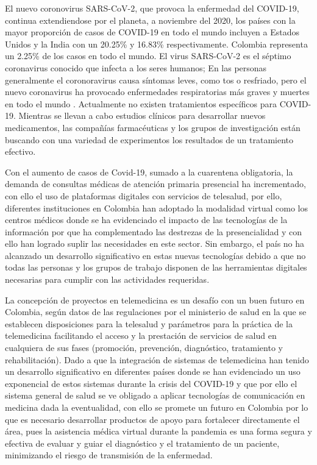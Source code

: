
El nuevo coronovirus SARS-CoV-2, que provoca la enfermedad del COVID-19, continua extendiendose por el planeta, a noviembre del 2020, los pa\'ises con la mayor proporci\'on de casos de COVID-19 en todo el mundo incluyen a Estados Unidos y la  India con un 20.25\% y 16.83\% respectivamente. Colombia representa un 2.25\% de los casos en todo el mundo. El virus SARS-CoV-2 es el s\'eptimo coronavirus conocido que infecta a los seres humanos; En las personas generalmente el coronoravirus causa s\'intomas leves, como tos o resfriado, pero el nuevo coronavirus ha provocado enfermedades respiratorias m\'as graves y muertes en todo el mundo \cite{28}. Actualmente no existen tratamientos espec\'ificos para COVID-19. Mientras se llevan a cabo estudios cl\'inicos para desarrollar nuevos medicamentos, las compa\~{n}\'ias farmac\'euticas y los grupos de investigaci\'on est\'an buscando con una variedad de experimentos los resultados de un tratamiento efectivo. 

Con el aumento de casos de Covid-19, sumado a la cuarentena obligatoria, la demanda de consultas m\'edicas de atenci\'on primaria presencial ha incrementado, con ello el uso de plataformas digitales con servicios de telesalud, por ello,  diferentes instituciones en Colombia han adoptado la modalidad virtual como los centros m\'edicos donde se ha evidenciado el impacto de las tecnolog\'ias de la informaci\'on por que ha complementado las destrezas de la presencialidad y con ello han logrado suplir las necesidades en este sector\cite{3}. Sin embargo, el pa\'is no ha alcanzado un desarrollo significativo en estas nuevas tecnolog\'ias debido a que no todas las personas y los grupos de trabajo disponen de las herramientas digitales necesarias para cumplir con las actividades requeridas. 

La concepci\'on de proyectos en telemedicina es un desaf\'io con un buen futuro en Colombia, seg\'un datos de  las regulaciones por el ministerio de salud en la que se establecen disposiciones para la telesalud y par\'ametros para la pr\'actica de la telemedicina facilitando el acceso y la prestaci\'on de servicios de salud en cualquiera de sus fases (promoci\'on, prevenci\'on, diagn\'ostico, tratamiento y rehabilitaci\'on)\cite{3}. Dado a que la integraci\'on de sistemas de telemedicina han tenido un desarrollo significativo en diferentes pa\'ises donde se han evidenciado un uso exponencial de estos sistemas durante la crisis del COVID-19 y que por ello el sistema general de salud se ve obligado a aplicar tecnolog\'ias de comunicaci\'on en medicina dada la eventualidad, con ello se promete un futuro en Colombia por lo que es necesario desarrollar productos de apoyo para fortalecer directamente el \'area, pues la asistencia m\'edica virtual durante la pandemia es una forma segura y efectiva de evaluar y guiar el diagn\'ostico y el tratamiento de un paciente, minimizando el riesgo de transmisi\'on de la enfermedad.


